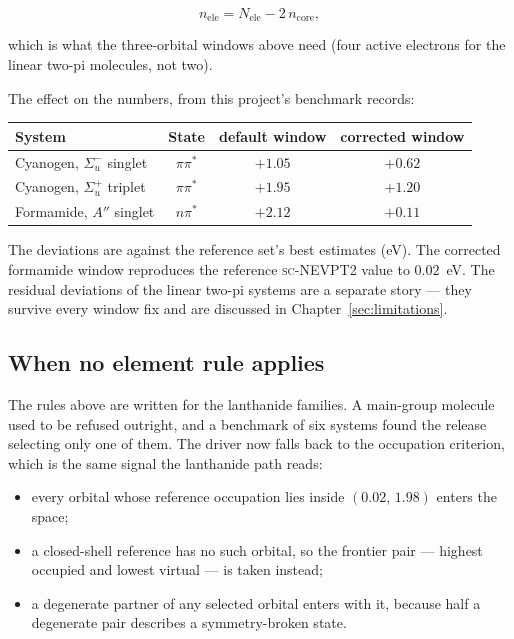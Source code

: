 \begin{equation}
  n_\mathrm{ele} = N_\mathrm{ele} - 2\, n_\mathrm{core},
\end{equation}

which is what the three-orbital windows above need (four active
electrons for the linear two-pi molecules, not two).

The effect on the numbers, from this project's benchmark records:

\begin{center}
\begin{tabular}{lccc}
\toprule
System & State & default window & corrected window \\
\midrule
Cyanogen, $\Sigma_u^-$ singlet & $\pi\pi^*$ & $+1.05$ & $+0.62$ \\
Cyanogen, $\Sigma_u^+$ triplet & $\pi\pi^*$ & $+1.95$ & $+1.20$ \\
Formamide, $A''$ singlet & $n\pi^*$ & $+2.12$ & $+0.11$ \\
\bottomrule
\end{tabular}
\end{center}

The deviations are against the reference set's best estimates (eV).
The corrected formamide window reproduces the reference
\textsc{sc}-NEVPT2 value to $0.02$~eV.  The residual deviations of the
linear two-pi systems are a separate story --- they survive every
window fix and are discussed in Chapter~\ref{sec:limitations}.

\subsection{When no element rule applies}
\label{sec:fallback-selection}

The rules above are written for the lanthanide families.  A main-group
molecule used to be refused outright, and a benchmark of six systems
found the release selecting only one of them.  The driver now falls
back to the occupation criterion, which is the same signal the
lanthanide path reads:

\begin{itemize}
\item every orbital whose reference occupation lies inside
  $(0.02,\,1.98)$ enters the space;
\item a closed-shell reference has no such orbital, so the frontier
  pair --- highest occupied and lowest virtual --- is taken instead;
\item a degenerate partner of any selected orbital enters with it,
  because half a degenerate pair describes a symmetry-broken state.
\end{itemize}

